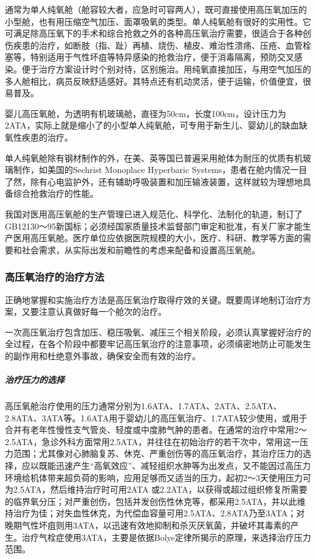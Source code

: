 通常为单人纯氧舱（舱容较大者，应急时可容两人），既可直接使用高压氧加压的小型舱，也有用压缩空气加压、面罩吸氧的类型。单人纯氧舱有很好的实用性。它可满足除高压氧下的手术和综合抢救之外的各种高压氧治疗需要，很适合于各种创伤疾患的治疗，如断肢（指、趾）再植、烧伤、植皮、难治性溃疡、压疮、血管栓塞等，特别适用于气性坏疽等特异感染的抢救治疗，便于消毒隔离，预防交叉感染。便于治疗方案设计时个别对待，区别施治。用纯氧直接加压，与用空气加压的多人舱相比，病员反映舒适感好。其特点还有机动灵活，便于运输，价值便宜，很易普及。

婴儿高压氧舱，为透明有机玻璃舱，直径为50cm，长度100cm，设计压力为2ATA，实际上就是缩小了的小型单人纯氧舱，可专用于新生儿、婴幼儿的缺血缺氧性疾患的治疗。

单人纯氧舱除有钢材制作的外，在美、英等国已普遍采用舱体为耐压的优质有机玻璃制作，如美国的Sechrist
Monoplace Hyperbaric
Systems，患者在舱内情况一目了然，除有心电监护外，还有辅助呼吸装置和加压输液装置，这样就较为理想地具备综合抢救治疗的性能。

我国对医用高压氧舱的生产管理已进入规范化、科学化、法制化的轨道，制订了GB12130～95新国标；必须经国家质量技术监督部门审定和批准，有关厂家才能生产医用高压氧舱。医疗单位应依据医院规模的大小，医疗、科研、教学等方面的需要和社会需求，从实际出发和前瞻性的考虑来配备和设置高压氧舱。

\subsubsection{高压氧治疗的治疗方法}

正确地掌握和实施治疗方法是高压氧治疗取得疗效的关键。既要周详地制订治疗方案，又要注意认真做好每一个舱次的治疗。

一次高压氧治疗包含加压、稳压吸氧、减压三个相关阶段，必须认真掌握好治疗的全过程，在各个阶段中都要牢记高压氧治疗的注意事项，必须缜密地防止可能发生的副作用和杜绝意外事故，确保安全而有效的治疗。

\subparagraph{治疗压力的选择}

高压氧舱治疗使用的压力通常分别为1.6ATA、1.7ATA、2ATA、2.5ATA、2.8ATA、3ATA等。1.6ATA用于婴幼儿的高压氧治疗、1.7ATA较少使用，或用于合并有老年性慢性支气管炎、轻度或中度肺气肿的患者。在通常的治疗中常用2～2.5ATA，急诊外科方面常用2.5ATA，并往往在初始治疗的若干次中，常用这一压力范围；尤其像对心肺脑复苏、休克、严重创伤等的高压氧治疗，其治疗压力的选择，应以既能迅速产生“高氧效应”、减轻组织水肿等为出发点，又不能因过高压力环境给机体带来超负荷的影响，应用足够而又适当的压力，起初2～3天使用压力可为2.5ATA，然后维持治疗时可用2ATA
或2.2ATA，以获得或超过组织修复所需要的临界氧分压；对严重创伤，包括并发创伤性休克等，都采用2.5ATA，并以此维持治疗为佳；对失血性休克，为代偿血容量可用2.5ATA、2.8ATA乃至3ATA；对晚期气性坏疽则用3ATA，以迅速有效地抑制和杀灭厌氧菌，并破坏其毒素的产生。治疗气栓症使用3ATA，主要是依据Bolye定律所揭示的原理，来选择治疗压力范围。


